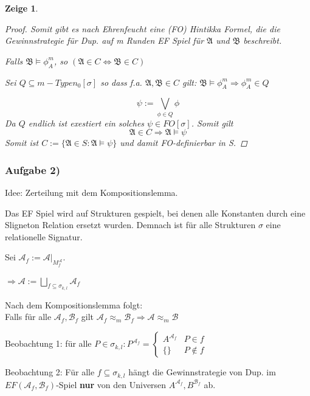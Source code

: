 \documentclass[12pt]{article}
\newtheorem{zeige}{Zeige}
\begin{document}
\begin{zeige}
\begin{proof}
  Somit gibt es nach Ehrenfeucht eine (FO) Hintikka Formel, die die Gewinnstrategie für Dup. auf m Runden EF Spiel für $\mathfrak{A}$ und $\mathfrak{B}$ beschreibt.
  

  \begin{center}
    Falls $\mathfrak{B} \models \phi^m_{A}$, so $(\mathfrak{A}\in C \Leftrightarrow \mathfrak{B}\in C )$
  \end{center}

  Sei $Q\subseteq m-Typen_0[\sigma]$ so dass f.a. $\mathfrak{A},\mathfrak{B}\in C$ gilt: $\mathfrak{B} \models \phi^m_{A} \Rightarrow \phi^m_{A}\in Q$
  
  \[ \psi := \bigvee_{\phi \in Q} \phi \] 
  Da $Q$ endlich ist exestiert ein solches $\psi\in FO[\sigma]$.
  Somit gilt 
  $$ \mathfrak{A}\in C \Rightarrow \mathfrak{A} \models \psi $$
  Somit ist $C:=\{\mathfrak{A}\in S: \mathfrak{A}\models \psi\}$ und damit FO-definierbar in S.

  
  
  
\end{proof}
\end{zeige}

\subsubsection*{Aufgabe 2)}
Idee: Zerteilung mit dem Kompositionslemma.

Das EF Spiel wird auf Strukturen gespielt, bei denen alle Konstanten durch eine Sligneton Relation ersetzt wurden. Demnach ist für alle Strukturen $\sigma$ eine relationelle Signatur.

Sei $\mathcal{A}_f := \left. \mathcal{A} \right|_{M_f^{\mathcal{A}}}$.

$\Rightarrow \mathcal{A} := \bigsqcup_{ f\subseteq \sigma_{k, l } } \mathcal{A}_f$

Nach dem Kompositionslemma folgt: \\

Falls für alle $\mathcal{A}_f,\mathcal{B}_f$ gilt $\mathcal{A}_f \approx_m \mathcal{B}_f \Rightarrow \mathcal{A} \approx_m \mathcal{B}$

Beobachtung 1: für alle $P\in\sigma_{k, l}: P^{\mathcal{A}_f}=
\begin{cases}
 A^{\mathcal{A}_f}&P\in f\\
 \{\}&P\notin f
\end{cases}$

Beobachtung 2: Für alle $f\subseteq \sigma_{k, l}$ hängt die Gewinnstrategie von Dup. im $EF(\mathcal{A}_f,\mathcal{B}_f)$-Spiel \textbf{nur} von den Universen $A^{ \mathcal{A}_f },B^{ \mathcal{B}_f }$ ab.
\end{document}
